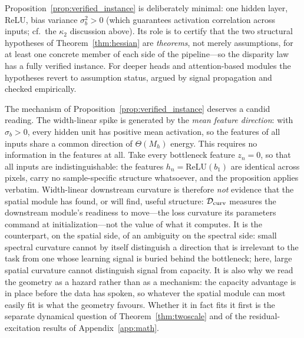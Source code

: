 \begin{remark}[Minimality]
\label{rem:instance_minimal}
Proposition~\ref{prop:verified_instance} is deliberately minimal: one hidden
layer, ReLU, bias variance $\sigma_b^2 > 0$ (which guarantees activation
correlation across inputs; cf.\ the $\kappa_2$ discussion above). Its role
is to certify that the two structural hypotheses of
Theorem~\ref{thm:hessian} are \emph{theorems}, not merely assumptions, for
at least one concrete member of each side of the pipeline---so the disparity
law has a fully verified instance. For deeper heads and attention-based
modules the hypotheses revert to assumption status, argued by signal
propagation and checked empirically.
\end{remark}

\begin{remark}
\label{rem:instance_interpretation}
The mechanism of Proposition~\ref{prop:verified_instance} deserves a candid
reading. The width-linear spike is generated by the \emph{mean feature
direction}: with $\sigma_b > 0$, every hidden unit has positive mean
activation, so the features of all inputs share a common direction of
$\Theta(M_h)$ energy. This requires no information in the features at all.
Take every bottleneck feature $z_n = 0$, so that all inputs are
indistinguishable: the features $h_n = \mathrm{ReLU}(b_1)$ are identical
across pixels, carry no sample-specific structure whatsoever, and the
proposition applies verbatim. Width-linear downstream curvature is therefore
\emph{not} evidence that the spatial module has found, or will find, useful
structure: $\mathcal{D}_{\mathrm{curv}}$ measures the downstream module's readiness to
move---the loss curvature its parameters command at initialization---not
the value of what it computes. It is the counterpart, on the spatial side,
of an ambiguity on the spectral side: small spectral curvature cannot by
itself distinguish a direction that is irrelevant to the task from one whose
learning signal is buried behind the bottleneck; here, large spatial
curvature cannot distinguish signal from capacity. It is also why we read
the geometry as a hazard rather than as a mechanism: the capacity advantage
is in place before the data has spoken, so whatever the spatial module can
most easily fit is what the geometry favours. Whether it in fact fits it
first is the separate dynamical question of Theorem~\ref{thm:twoscale} and
of the residual-excitation results of Appendix~\ref{app:math}.
\end{remark}

